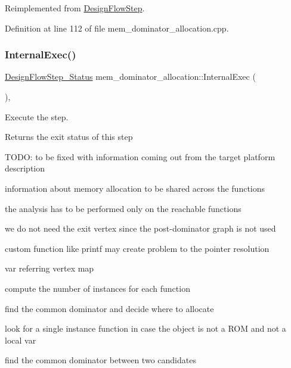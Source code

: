 Reimplemented from \hyperlink{classDesignFlowStep_a44b50683382a094976e1d432a7784799}{Design\+Flow\+Step}.



Definition at line 112 of file mem\+\_\+dominator\+\_\+allocation.\+cpp.

\mbox{\label{classmem__dominator__allocation_a729c2a36b1495fbccb94e35dd6c433c3}} 
\subsubsection{\texorpdfstring{Internal\+Exec()}{InternalExec()}}
{\footnotesize\ttfamily \hyperlink{design__flow__step_8hpp_afb1f0d73069c26076b8d31dbc8ebecdf}{Design\+Flow\+Step\+\_\+\+Status} mem\+\_\+dominator\+\_\+allocation\+::\+Internal\+Exec (\begin{DoxyParamCaption}{ }\end{DoxyParamCaption})\hspace{0.3cm}{\ttfamily [override]}, {\ttfamily [virtual]}}



Execute the step. 

\begin{DoxyReturn}{Returns}
the exit status of this step 
\end{DoxyReturn}
T\+O\+DO\+: to be fixed with information coming out from the target platform description

information about memory allocation to be shared across the functions

the analysis has to be performed only on the reachable functions

we do not need the exit vertex since the post-\/dominator graph is not used

custom function like printf may create problem to the pointer resolution

var referring vertex map

compute the number of instances for each function

find the common dominator and decide where to allocate

look for a single instance function in case the object is not a R\+OM and not a local var

find the common dominator between two candidates

